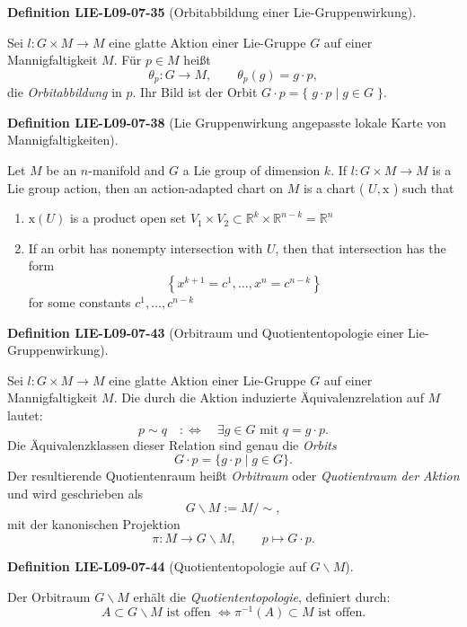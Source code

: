 \documentclass[10pt, letterpaper]{article}
\newcommand{\CustomHeading}[3]{%
  \par\medskip\noindent%
  \textbf{#1 #2} \textnormal{(#3)}.\enskip%
}
\newenvironment{DEF}[2]{\CustomHeading{Definition}{#1}{#2}}{}
\begin{document}
\begin{DEF}{LIE-L09-07-35}{Orbitabbildung einer Lie-Gruppenwirkung}
Sei $l:G\times M\to M$ eine glatte Aktion einer Lie-Gruppe $G$ auf einer Mannigfaltigkeit $M$.
Für $p\in M$ heißt
\[
\theta_p:G\longrightarrow M,\qquad
\theta_p(g)=g\cdot p,
\]
die \emph{Orbitabbildung} in $p$.
Ihr Bild ist der Orbit $G\cdot p=\{\;g\cdot p\mid g\in G\;\}$.
\end{DEF}

\begin{DEF}{LIE-L09-07-38}{Lie Gruppenwirkung angepasste lokale Karte von Mannigfaltigkeiten}
Let $M$ be an $n$-manifold and $G$ a Lie group of dimension $k$. If $l: G \times M \rightarrow M$ is a Lie group action, then an action-adapted chart on $M$ is a chart ( $U, \mathrm{x}$ ) such that\\
\begin{enumerate}
\item $\mathrm{x}(U)$ is a product open set $V_{1} \times V_{2} \subset \mathbb{R}^{k} \times \mathbb{R}^{n-k}=\mathbb{R}^{n}$
\item If an orbit has nonempty intersection with $U$, then that intersection has the form
$$
\left\{x^{k+1}=c^{1}, \ldots, x^{n}=c^{n-k}\right\}
$$
for some constants $c^{1}, \ldots, c^{n-k}$
\end{enumerate}
\end{DEF}

\begin{DEF}{LIE-L09-07-43}{Orbitraum und Quotiententopologie einer Lie-Gruppenwirkung}
Sei $l:G\times M\to M$ eine glatte Aktion einer Lie-Gruppe $G$ auf einer Mannigfaltigkeit $M$.
Die durch die Aktion induzierte Äquivalenzrelation auf $M$ lautet:
\[
p\sim q
\quad:\Longleftrightarrow\quad
\exists g\in G\text{ mit } q=g\cdot p.
\]
Die Äquivalenzklassen dieser Relation sind genau die \emph{Orbits}
\[
G\cdot p=\{g\cdot p\mid g\in G\}.
\]
Der resultierende Quotientenraum heißt \emph{Orbitraum} oder \emph{Quotientraum der Aktion} und wird geschrieben als
\[
G\backslash M := M/\!\sim,
\]
mit der kanonischen Projektion
\[
\pi:M\longrightarrow G\backslash M,\qquad p\longmapsto G\cdot p.
\]
\end{DEF}

\begin{DEF}{LIE-L09-07-44}{Quotiententopologie auf $G\backslash M$}
Der Orbitraum $G\backslash M$ erhält die \emph{Quotiententopologie}, definiert durch:
\[
A\subset G\backslash M\text{ ist offen }
\iff
\pi^{-1}(A)\subset M\text{ ist offen.}
\]
\end{DEF}
\end{document}
